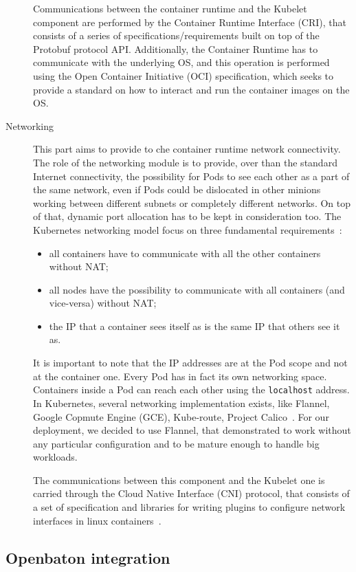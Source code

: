 \begin{description}
  Communications between the container runtime and the Kubelet component are
  performed by the Container Runtime Interface (CRI), that consists of a series
  of specifications/requirements built on top of the Protobuf protocol API.
  Additionally, the Container Runtime has to communicate with the underlying OS,
  and this operation is performed using the Open Container Initiative (OCI)
  specification, which seeks to provide a standard on how to interact and run
  the container images on the OS.
\item[Networking] This part aims to provide to che container runtime network
  connectivity. The role of the networking module is to provide, over than the
  standard Internet connectivity, the possibility for Pods to see each other as
  a part of the same network, even if Pods could be dislocated in other minions
  working between different subnets or completely different networks. On top of
  that, dynamic port allocation has to be kept in consideration too. The
  Kubernetes networking model focus on three fundamental
  requirements~\cite{k8snetworkingwiki}:
  \begin{itemize}
  \item all containers have to communicate with all the other containers without
    NAT;
  \item all nodes have the possibility to communicate with all containers (and
    vice-versa) without NAT;
  \item the IP that a container sees itself as is the same IP that others see it
    as.
  \end{itemize}
  It is important to note that the IP addresses are at the Pod scope and not at
  the container one. Every Pod has in fact its own networking space. Containers
  inside a Pod can reach each other using the \verb!localhost! address. In
  Kubernetes, several networking implementation exists, like Flannel, Google
  Copmute Engine (GCE), Kube-route, Project Calico~\cite{k8snetworkingwiki}. For
  our deployment, we decided to use Flannel, that demonstrated to work without
  any particular configuration and to be mature enough to handle big workloads.

  The communications between this component and the Kubelet one is carried
  through the Cloud Native Interface (CNI) protocol, that consists of a set
  of specification and libraries for writing plugins to configure network
  interfaces in linux containers~\cite{cnigithub}.
\end{description}

\subsection{Openbaton integration}

